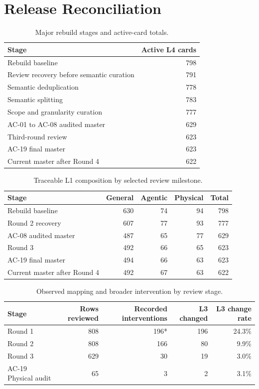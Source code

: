 \documentclass[10pt,a4paper]{article}
\begin{document}
\section{Release Reconciliation}

\begin{table}[H]
\centering
\caption{Major rebuild stages and active-card totals.}
\begin{tabular}{lr}
\toprule
Stage & Active L4 cards \\
\midrule
Rebuild baseline & 798 \\
Review recovery before semantic curation & 791 \\
Semantic deduplication & 778 \\
Semantic splitting & 783 \\
Scope and granularity curation & 777 \\
AC-01 to AC-08 audited master & 629 \\
Third-round review & 623 \\
AC-19 final master & 623 \\
Current master after Round 4 & 622 \\
\bottomrule
\end{tabular}
\end{table}

\begin{table}[H]
\centering
\caption{Traceable L1 composition by selected review milestone.}
\label{tab:domain-stages}
\begin{tabular}{lrrrr}
\toprule
Stage & General & Agentic & Physical & Total \\
\midrule
Rebuild baseline & 630 & 74 & 94 & 798 \\
Round 2 recovery & 607 & 77 & 93 & 777 \\
AC-08 audited master & 487 & 65 & 77 & 629 \\
Round 3 & 492 & 66 & 65 & 623 \\
AC-19 final master & 494 & 66 & 63 & 623 \\
Current master after Round 4 & 492 & 67 & 63 & 622 \\
\bottomrule
\end{tabular}
\end{table}

\begin{table}[H]
\centering
\caption{Observed mapping and broader intervention by review stage.}
\label{tab:intervention-stages}
\begin{tabular}{lrrrr}
\toprule
Stage & Rows reviewed & Recorded interventions & L3 changed & L3 change rate \\
\midrule
Round 1 & 808 & 196* & 196 & 24.3\% \\
Round 2 & 808 & 166 & 80 & 9.9\% \\
Round 3 & 629 & 30 & 19 & 3.0\% \\
AC-19 Physical audit & 65 & 3 & 2 & 3.1\% \\
\bottomrule
\end{tabular}
\end{table}
\end{document}
